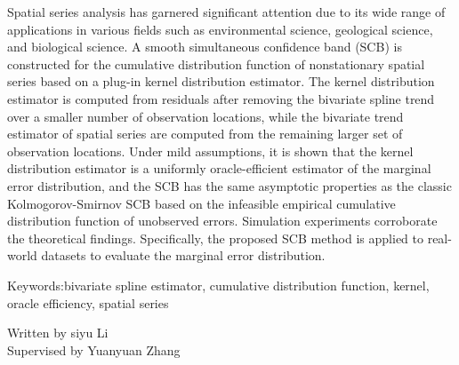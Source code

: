 Spatial series analysis has garnered significant attention due to its wide range of applications in various fields such as environmental science, geological science, and biological science. A smooth simultaneous confidence band (SCB) is constructed for the cumulative distribution function of nonstationary spatial series based on a plug-in kernel distribution estimator. The kernel distribution estimator is computed from residuals after removing the bivariate spline trend over a smaller number of observation locations, while the bivariate trend estimator of spatial series are computed from the remaining larger
set of observation locations. Under mild assumptions, it is shown that the kernel distribution estimator is a uniformly oracle-efficient estimator of the marginal error distribution, and the SCB has the same asymptotic properties as the classic Kolmogorov-Smirnov SCB based on the infeasible empirical cumulative
distribution function of unobserved errors. Simulation experiments corroborate the theoretical findings. Specifically, the proposed SCB method is applied to real-world datasets to evaluate the marginal error distribution.

{Keywords:}bivariate spline estimator, cumulative distribution function, kernel, oracle efficiency, spatial series

\begin{flushright}
  Written by siyu Li\\
Supervised by Yuanyuan Zhang
\end{flushright}


